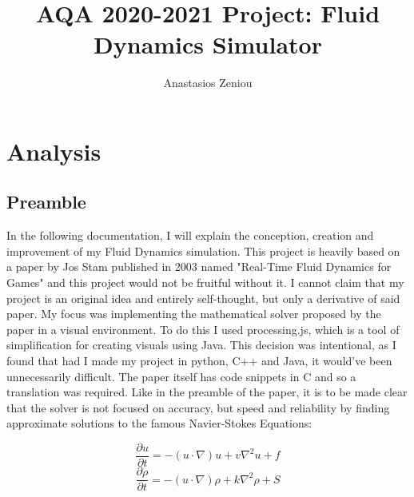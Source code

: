 \documentclass[12pt,a4paper]{book}
\begin{document}
\title{\textbf{AQA 2020-2021 Project: Fluid Dynamics Simulator}}
\author{Anastasios Zeniou}

\date{}
\maketitle
\tableofcontents

\pagebreak


\chapter{Analysis}
\section{Preamble}
In the following documentation, I will explain the conception, creation and improvement of my Fluid Dynamics simulation. This project is heavily based on a paper by Jos Stam published in 2003 named "Real-Time Fluid Dynamics for Games" and this project would not be fruitful without it. I cannot claim that my project is an original idea and entirely self-thought, but only a derivative of said paper. My focus was implementing the mathematical solver proposed by the paper in a visual environment. To do this I used processing.js, which is a tool of simplification for creating visuals using Java. This decision was intentional, as I found that had I made my project in python, C++ and Java, it would've been unnecessarily difficult. The paper itself has code snippets in C and so a translation was required. Like in the preamble of the paper, it is to be made clear that the solver is not focused on accuracy, but speed and reliability by finding approximate solutions to the famous Navier-Stokes Equations:

\begin{equation*}\label{nseq:vel}
	\dfrac{\partial u}{\partial t} = -(u\cdot \nabla)u + v{\nabla}^2u + f
\end{equation*}
\begin{equation*}\label{nseq:den}
	\dfrac{\partial \rho}{\partial t} = -(u \cdot \nabla)\rho + k{\nabla}^2\rho + S
\end{equation*}
\end{document}
